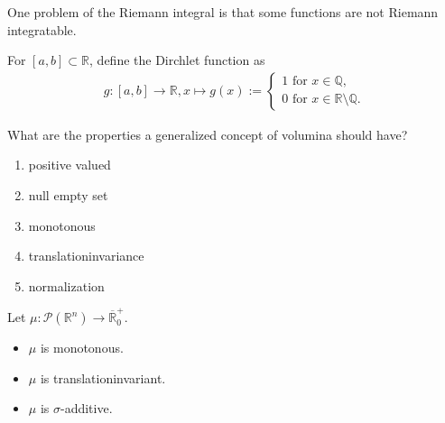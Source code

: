 One problem of the Riemann integral is that some functions are not Riemann integratable.
\begin{example}
    For \([a, b] \subset \mathbb{R}\), define the Dirchlet function as
    \begin{align}
        g: [a, b] \rightarrow \mathbb{R}, x \mapsto g(x) :=
        \begin{cases}
            1 \text{ for } x \in \mathbb{Q},\\
            0 \text{ for } x \in \mathbb{R} \setminus \mathbb{Q} \text{.}
        \end{cases}
    \end{align}
\end{example}
What are the properties a generalized concept of volumina should have?
\begin{enumerate}
    \item positive valued
    \item null empty set
    \item monotonous
    \item translationinvariance
    \item normalization
\end{enumerate}

\begin{definition}
Let \(\mu: \mathcal{P}(\mathbb{R}^n) \rightarrow \overline{\mathbb{R}}^{+}_0.\)
\begin{itemize}
    \item \(\mu\) is monotonous.
    \item \(\mu\) is translationinvariant.
    \item \(\mu\) is \(\sigma\)-additive.
\end{itemize}
\end{definition}
\begin{theorem}    
\end{theorem}